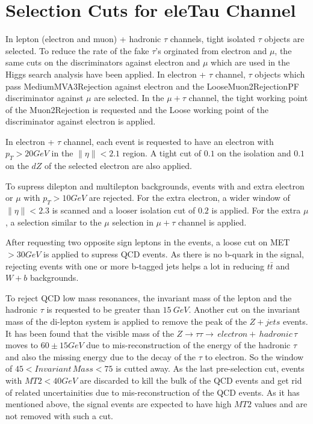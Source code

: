 \section{Selection Cuts for eleTau Channel}
\label{sect:eleTauCuts}
In lepton (electron and muon) + hadronic $\tau$ channels, tight isolated $\tau$ objects are selected. To reduce the rate of the fake $\tau$'s orginated from electron and $\mu$, the same cuts on the discriminators against electron and $\mu$ which are used in the Higgs search analysis have been applied. In electron + $\tau$ channel, $\tau$ objects which pass MediumMVA3Rejection against electron and the LooseMuon2RejectionPF discriminator against $\mu$ are selected. In the $\mu + \tau$ channel, the tight working point of the Muon2Rejection is requested and the Loose working point of the discriminator against electron is applied.

 
In electron + $\tau$ channel, each event is requested to have an electron with $p_{T}>20 GeV$ in the $\|\eta\| < 2.1 $ region. A tight cut of $0.1$ on the isolation and $0.1$ on the $dZ$ of the selected electron are also applied.

To supress dilepton and multilepton backgrounds, events with and extra electron or $\mu$ with $p_{T}>10 GeV$ are rejected. For the extra electron, a wider window of $\|\eta\|<2.3$ is scanned and a looser isolation cut of $0.2$ is applied. For the extra $\mu$, a selection similar to the $\mu$ selection in $\mu+\tau$ channel is applied.


After requesting two opposite sign leptons in the events, a loose cut on MET $>30 GeV$ is applied to supress QCD events. As there is no b-quark in the signal, rejecting events with one or more b-tagged jets helps a lot in reducing $t\bar{t}$ and $W+b$ backgrounds.

To reject QCD low mass resonances, the invariant mass of the lepton and the hadronic $\tau$ is requested to be greater than $15\ GeV$. Another cut on the invariant mass of the di-lepton system is applied to remove the peak of the $Z+jets$ events. It has been found that the visible mass of the $Z\to\tau\tau\to\,electron +\,hadronic\,\tau$ moves to $60 \pm 15 GeV$ due to mis-reconstruction of the energy of the hadronic $\tau$ and also the missing energy due to the decay of the $\tau$ to electron. So the window of $45 < Invariant\,Mass < 75$ is cutted away. As the last pre-selection cut, events with $MT2<40 GeV$ are discarded to kill the bulk of the QCD events and get rid of related uncertainities due to mis-reconstruction of the QCD events. As it has mentioned above, the signal events are expected to have high $MT2$ values and are not removed with such a cut.

